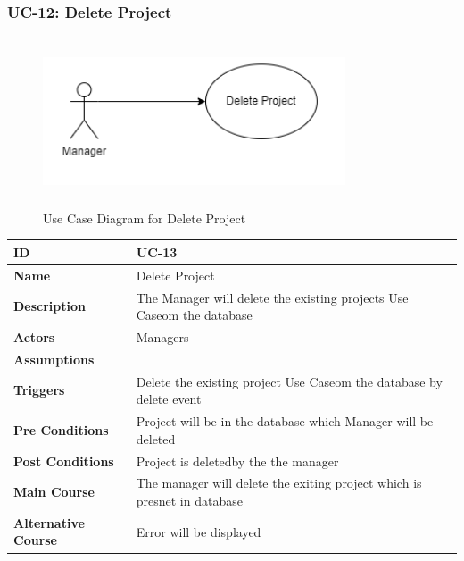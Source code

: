     \subsubsection{UC-12: Delete Project}
    \begin{figure}[H]
        \includegraphics[height=5cm, width=0.8\textwidth]{./diagrams/Use Case/u12.png}
        \centering 
        \caption{Use Case Diagram for Delete Project}
        \label{fig:Usecase1}
        \end{figure}
        
    \begin{center}
        \begin{tabularx}{\textwidth}{|l|X|}
            \hline
            \textbf{ID} & UC-13 \\
            \hline
            \textbf{Name} & Delete Project \\
            \hline
            \textbf{Description} & The Manager will delete the existing projects Use Caseom the database \\
            \hline
            \textbf{Actors} & Managers \\
            \hline
            \textbf{Assumptions} &  \\
            \hline
            \textbf{Triggers} & Delete the existing project Use Caseom the database by delete event \\
            \hline
            \textbf{Pre Conditions} & Project will be in the database which Manager will be deleted \\
            \hline
            \textbf{Post Conditions} & Project is deletedby the the manager \\
            \hline
            \textbf{Main Course} & The manager will delete the exiting project which is presnet in database \\
            \hline
            \textbf{Alternative Course} & Error will be displayed \\
            \hline
            
        \end{tabularx}
    \end{center}
    \newpage
    

